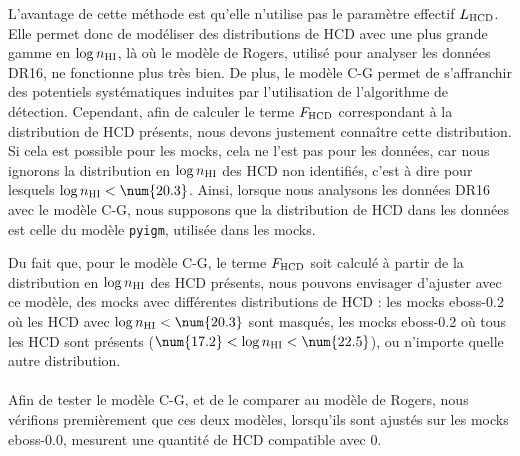L'avantage de cette méthode est qu'elle n'utilise pas le paramètre effectif $L_{\textsc{HCD}}$. Elle permet donc de modéliser des distributions de HCD avec une plus grande gamme en $\log n_{\textsc{HI}}$, là où le modèle de Rogers, utilisé pour analyser les données DR16, ne fonctionne plus très bien.
De plus, le modèle C-G permet de s'affranchir des potentiels systématiques induites par l'utilisation de l'algorithme de détection.
Cependant, afin de calculer le terme $F_{\textsc{HCD}}$ correspondant à la distribution de HCD présents, nous devons justement connaître cette distribution. Si cela est possible pour les mocks, cela ne l'est pas pour les données, car nous ignorons la distribution en $\log n_{\textsc{HI}}$ des HCD non identifiés, c'est à dire pour lesquels $\log n_{\textsc{HI}} < \num{20.3}$.
Ainsi, lorsque nous analysons les données DR16 avec le modèle C-G, nous supposons que la distribution de HCD dans les données est celle du modèle \texttt{pyigm}, utilisée dans les mocks. %

Du fait que, pour le modèle C-G, le terme $F_{\textsc{HCD}}$ soit calculé à partir de la distribution en $\log n_{\textsc{HI}}$ des HCD présents, nous pouvons envisager d'ajuster avec ce modèle, des mocks avec différentes distributions de HCD : les mocks eboss-0.2 où les HCD avec $\log n_{\textsc{HI}} < \num{20.3}$ sont  masqués, les mocks eboss-0.2 où tous les HCD sont présents ($\num{17.2} < \log n_{\textsc{HI}} < \num{22.5}$), ou n'importe quelle autre distribution.

\paragraph{}
Afin de tester le modèle C-G, et de le comparer au modèle de Rogers, nous vérifions premièrement que ces deux modèles, lorsqu'ils sont ajustés sur les mocks eboss-0.0, mesurent une quantité de HCD compatible avec 0.

